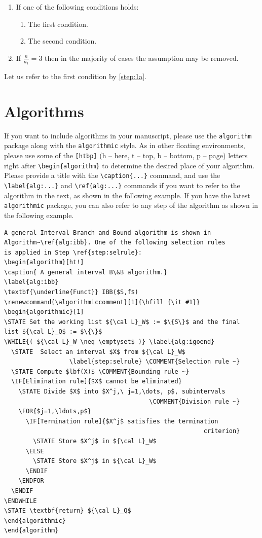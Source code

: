 \documentclass[theoremcontinuousnumbering,withtitlethanks]{actacyb}
\begin{document}
\begin{enumerate}
\item If one of the following conditions holds:
\begin{enumerate}
\item The first condition.\label{step:1a}
\item The second condition.
\end{enumerate}
\item If ${\frac{n}{n_1}}=3$ then in the majority of cases the 
assumption may be removed.
\end{enumerate}

Let us refer to the first condition by \ref{step:1a}.


\section{Algorithms}

If you want to include algorithms in your manuscript, please use the \verb|algorithm| package along with the \verb|algorithmic| style.
As in other floating environments, please use some of the \verb|[htbp]| (h -- here, t -- top, b -- bottom, p -- page) letters right after \verb|\begin{algorithm}| to determine the desired place of your algorithm. Please provide a title with the \verb|\caption{...}| command, and use the \verb|\label{alg:...}| and \verb|\ref{alg:...}| commands if you want to refer to the algorithm in the text, as shown in the following example.
If you have the latest \verb|algorithmic| package, you can also refer to any step of the algorithm as shown in the following example.

\begin{verbatim}
A general Interval Branch and Bound algorithm is shown in 
Algorithm~\ref{alg:ibb}. One of the following selection rules
is applied in Step \ref{step:selrule}:
\begin{algorithm}[ht!]
\caption{ A general interval B\&B algorithm.} 
\label{alg:ibb} 
\textbf{\underline{Funct}} IBB($S,f$)
\renewcommand{\algorithmiccomment}[1]{\hfill {\it #1}}
\begin{algorithmic}[1]
\STATE Set the working list ${\cal L}_W$ := $\{S\}$ and the final 
list ${\cal L}_Q$ := $\{\}$     
\WHILE{( ${\cal L}_W \neq \emptyset$ )} \label{alg:igoend}
  \STATE  Select an interval $X$ from ${\cal L}_W$
                  \label{step:selrule} \COMMENT{Selection rule ~}  
  \STATE Compute $lbf(X)$ \COMMENT{Bounding rule ~}		  
  \IF[Elimination rule]{$X$ cannot be eliminated}
    \STATE Divide $X$ into $X^j,\ j=1,\dots, p$, subintervals   
                                        \COMMENT{Division rule ~}
    \FOR{$j=1,\ldots,p$}
      \IF[Termination rule]{$X^j$ satisfies the termination 
                                                       criterion}
        \STATE Store $X^j$ in ${\cal L}_W$ 
      \ELSE
        \STATE Store $X^j$ in ${\cal L}_W$ 
      \ENDIF
    \ENDFOR  
  \ENDIF
\ENDWHILE
\STATE \textbf{return} ${\cal L}_Q$
\end{algorithmic}
\end{algorithm}
\end{verbatim}
\end{document}
